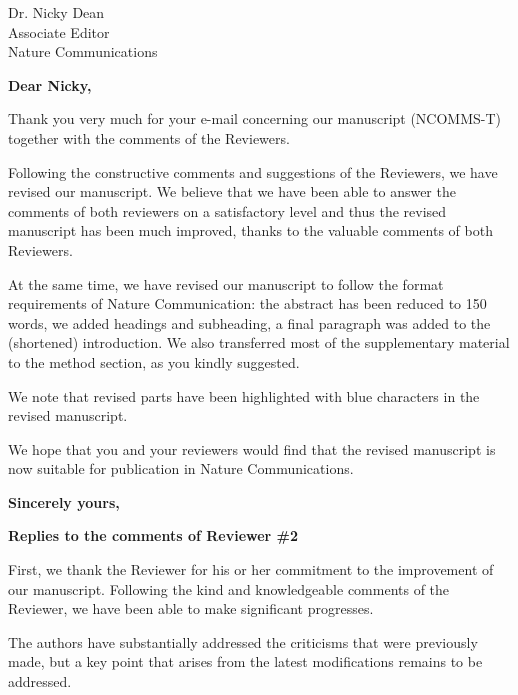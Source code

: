 \documentclass[a4paper, rebuttal, parskip=true, firsthead=false, fromemail=true, foldmarks=false]{scrlttr2}
\begin{document}
 
\begin{letter}{Dr. Nicky Dean\\
Associate Editor\\
Nature Communications}
\opening{\bf Dear Nicky,}

Thank you very much for your e-mail concerning our manuscript (NCOMMS\nobreakdash-T) together with the comments of the Reviewers. 

Following the constructive comments and suggestions of the Reviewers, we have revised our manuscript. 
We believe that we have been able to answer the comments of both reviewers on a satisfactory level and thus the revised manuscript has been much improved, thanks to the valuable comments of both Reviewers. 

At the same time, we have revised our manuscript to follow the format requirements of Nature Communication: the abstract has been reduced to 150 words, we added headings and subheading, a final paragraph was added to the (shortened) introduction. We also transferred most of the supplementary material to the method section, as you kindly suggested.

We note that revised parts have been highlighted with blue characters in the revised manuscript. 

We hope that you and your reviewers would find that the revised manuscript is now suitable for publication in Nature Communications. 

\closing{\bf Sincerely yours,} 

\textsf{\textbf{Replies to the comments of Reviewer \#2}}

First, we thank the Reviewer for his or her commitment to the improvement of our manuscript. Following the kind and knowledgeable comments of the Reviewer, we have been able to make significant progresses.

\begin{quotationi}
The authors have substantially addressed the criticisms that were previously made, but a key point that arises from the latest modifications remains to be addressed.


\end{quotationi}
\end{letter}
\end{document}
